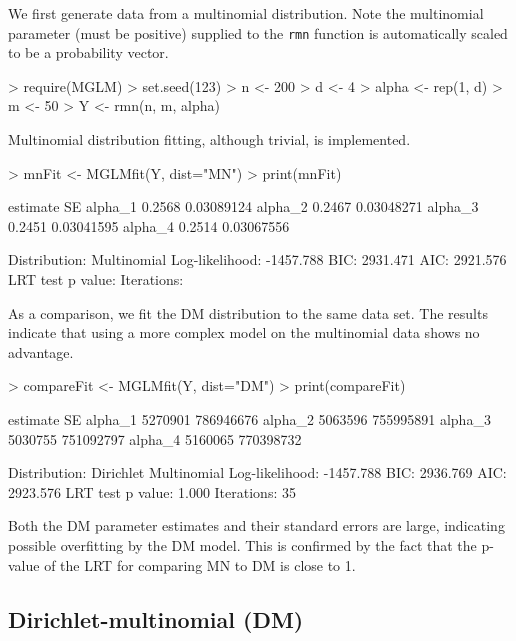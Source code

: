 \documentclass[a4paper]{article}
\begin{document}
We first generate data from a multinomial distribution. Note the multinomial parameter (must be positive) supplied to the {\tt rmn} function is automatically scaled to be a probability vector.
\begin{Schunk}
\begin{Sinput}
> require(MGLM)
> set.seed(123)
> n <- 200
> d <- 4
> alpha <- rep(1, d)
> m <- 50
> Y <- rmn(n, m, alpha)
\end{Sinput}
\end{Schunk}
Multinomial distribution fitting, although trivial, is implemented. 
\begin{Schunk}
\begin{Sinput}
> mnFit <- MGLMfit(Y, dist="MN")
> print(mnFit)
\end{Sinput}
\begin{Soutput}
        estimate         SE
alpha_1   0.2568 0.03089124
alpha_2   0.2467 0.03048271
alpha_3   0.2451 0.03041595
alpha_4   0.2514 0.03067556

Distribution: Multinomial
Log-likelihood: -1457.788
BIC: 2931.471
AIC: 2921.576
LRT test p value: 
Iterations: 
\end{Soutput}
\end{Schunk}

As a comparison, we fit the DM distribution to the same data set.  The results indicate that using a more complex model on the multinomial data shows no advantage.
\begin{Schunk}
\begin{Sinput}
> compareFit <- MGLMfit(Y, dist="DM")
> print(compareFit)
\end{Sinput}
\begin{Soutput}
        estimate        SE
alpha_1  5270901 786946676
alpha_2  5063596 755995891
alpha_3  5030755 751092797
alpha_4  5160065 770398732

Distribution: Dirichlet Multinomial
Log-likelihood: -1457.788
BIC: 2936.769
AIC: 2923.576
LRT test p value: 1.000
Iterations: 35
\end{Soutput}
\end{Schunk}
Both the DM parameter estimates and their standard errors are large, indicating possible overfitting by the DM model. This is confirmed by the fact that the p-value of the LRT for comparing MN to DM is close to 1.

\subsection{Dirichlet-multinomial (DM)}
\end{document}

